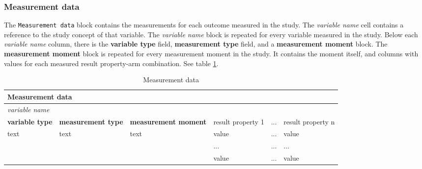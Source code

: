 \documentclass[a4paper,10pt]{article}
\begin{document}
\subsubsection*{Measurement data}
The \texttt{Measurement data} block contains the measurements for each outcome measured in the study. The \textit{variable name} cell contains a reference to the study concept of that variable. The \textit{variable name} block is repeated for every variable measured in the study. Below each \textit{variable name} column, there is the \textbf{variable type} field, \textbf{measurement type} field, and a \textbf{measurement moment} block. The \textbf{measurement moment} block is repeated for every measurement moment in the study. It contains the moment itself, and columns with values for each measured result property-arm combination.
See table \ref{table:Measurement data}.
\begin{table}[h]
  \centering
  \caption{Measurement data}
  \small
  \label{table:Measurement data}
  \begin{tabular}{|l|l|l|l|l|l|}
    \hline
    \multicolumn{6}{|l}{\textbf{Measurement data}}  \\ \hline
    \multicolumn{6}{|l|}{\textit{variable name}}    \\ \hline
    \textbf{variable type} &\textbf{ measurement type} & \textbf{measurement moment} & result property 1 &  ... & result property n \\ \hline
    text & text & text & value & ... & value        \\  \cline{4-6} 
         &      &      & ...   & ... & ...          \\  \cline{4-6} 
         &      &      & value & ... & value        \\ \hline
  \end{tabular}
\end{table}
\end{document}
